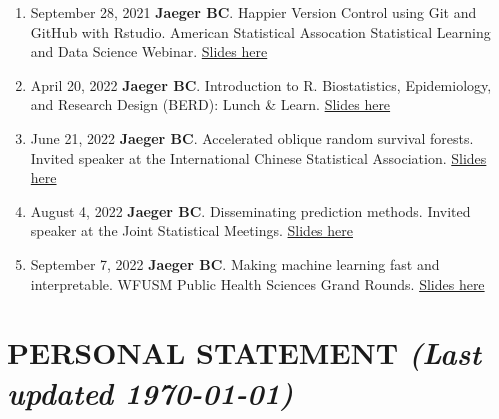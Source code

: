 \documentclass[11pt]{cv_wakeforest_article}
\newcommand{\AR}[1]{#1}  %
\newcommand{\mysection}[1]{\section*{#1}}
\newcommand{\me}{{\bfseries Jaeger BC}}
\begin{document}
\begin{enumerate}

\item September 28, 2021 \me. \AR{Happier Version Control using Git and GitHub with Rstudio. American Statistical Assocation Statistical Learning and Data Science Webinar.} \href{https://bcjaeger.github.io/seminar-git/#1}{Slides here}

\item April 20, 2022 \me. \AR{Introduction to R. Biostatistics, Epidemiology, and Research Design (BERD): Lunch \& Learn.} \href{https://bcjaeger.github.io/lunch-and-learn/#1}{Slides here}

\item June 21, 2022 \me. \AR{Accelerated oblique random survival forests. Invited speaker at the International Chinese Statistical Association.} \href{https://bcjaeger.github.io/aorsf-bench}{Slides here}

\item August 4, 2022 \me. Disseminating prediction methods. Invited speaker at the Joint Statistical Meetings. \href{https://bcjaeger.github.io/seminar-fastpack/#1}{Slides here}

\item September 7, 2022 \me. Making machine learning fast and interpretable. WFUSM Public Health Sciences Grand Rounds. \href{https://bcjaeger.github.io/seminar-orsf-grandrounds/#1}{Slides here}

\end{enumerate}



\mysection{PERSONAL STATEMENT {\normalfont\emph{(Last updated \today)}}}
{\setlength\parindent{1cm}




}
\end{document}
